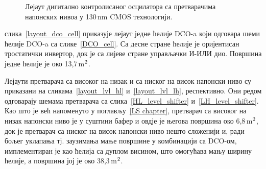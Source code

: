 \documentclass[master]{finthesis}
\def \DCO  {DCO} %
\begin{document}
\begin{figure}[!ht]
	 \centering
	 \vspace{-0.3cm}
	\caption{Лејаут дигитално контролисаног осцилатора са претварачима напонских нивоа у 130\,nm CMOS технологији.}
	\label{layout_dco5_130}
\end{figure}
слика~\ref{layout_dco_cell} приказује лејаут једне ћелије \DCO-a који одговара шеми ћелије \DCO-a са слике~\ref{DCO_cell}. Са десне стране ћелије је оријентисан тростатички инвертор, док је са лијеве стране управљачки И-ИЛИ дио. Површина једне ћелије је око 13,7\,\text\textmu m$^\text2$. \par
Лејаути претварача са високог на низак и са ниског на висок напонски ниво су приказани на сликама~\ref{layout_lvl_hl} и~\ref{layout_lvl_lh}, респективно. Они редом одговарају шемама претварача са слика~\ref{HL_level_shifter} и~\ref{LH_level_shifter}. Као што је већ напоменуто у поглављу~\ref{LS chapter}, претварач са високог на низак напонски ниво је у суштини бафер и овдје је његова површина око 6,8\,\text\textmu m$^\text2$, док је претварач са ниског на висок напонски ниво нешто сложенији и, ради бољег уклапања тј. заузимања мање површине у комбинацији са \DCO-ом, имплементиран је као ћелија са дуплом висином, што омогућава мању ширину ћелије, а површина јој је око 38,3\,\text\textmu m$^\text2$. \par 
\end{document}
